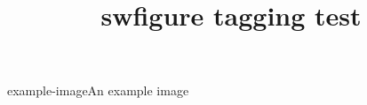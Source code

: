 \documentclass{book}
\title{swfigure tagging test}
\begin{document}
\begin{DFimage}{example-image}{An example image}
\kant[1-2]
\end{DFimage}
\end{document}
